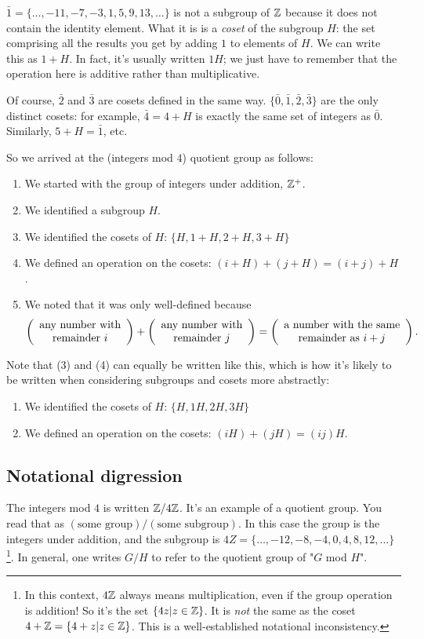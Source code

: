 $\bar 1 = \{\ldots, -11, -7, -3, 1, 5, 9, 13, \ldots\}$ is not a subgroup of
$\mathbb{Z}$ because it does not contain the identity element. What it is is a
\emph{coset} of the subgroup $H$: the set comprising all the results you get by
adding $1$ to elements of $H$. We can write this as $1 + H$. In fact, it's
usually written $1H$; we just have to remember that the operation here is
additive rather than multiplicative.

Of course, $\bar 2$ and $\bar 3$ are cosets defined in the same way. $\{\bar 0,
\bar 1, \bar 2, \bar 3\}$ are the only distinct cosets: for example, $\bar 4 =
4+H$ is exactly the same set of integers as $\bar 0$. Similarly, $5 + H = \bar
1$, etc.

So we arrived at the (integers mod $4$) quotient group as follows:

\begin{enumerate}
\item We started with the group of integers under addition, $\mathbb{Z}^+$.
\item We identified a subgroup $H$.
\item We identified the cosets of $H$: $\{H, 1+H, 2+H, 3+H\}$
\item We defined an operation on the cosets: $(i+H) + (j+H) = (i+j)+H$.
\item We noted that it was only well-defined because
  \begin{align*}
    \left(\begin{array}{c} \text{any number with} \\ \text{remainder $i$} \end{array}\right) +
    \left(\begin{array}{c} \text{any number with} \\ \text{remainder $j$} \end{array}\right) =
    \left(\begin{array}{c} \text{a number with the same} \\ \text{remainder as $i+j$} \end{array}\right).
  \end{align*}
\end{enumerate}

Note that (3) and (4) can equally be written like this, which is how it's
likely to be written when considering subgroups and cosets more abstractly:

\begin{enumerate}
\item We identified the cosets of $H$: $\{H, 1H, 2H, 3H\}$
\item We defined an operation on the cosets: $(iH) + (jH) = (ij)H$.
\end{enumerate}

\subsection{Notational digression}

The integers mod $4$ is written $\mathbb{Z}/4\mathbb{Z}$. It's an example of a quotient
group. You read that as $(\text{some group}) / (\text{some subgroup})$. In this
case the group is the integers under addition, and the subgroup is
$4Z = \{\ldots, -12, -8, -4, 0, 4, 8, 12, \ldots\}$\footnote{In this context,
  $4\mathbb{Z}$ always means multiplication, even if the group operation is addition!
  So it's the set $\{4z|z \in \mathbb{Z}\}$. It is \emph{not} the same as the coset
  $4 + \mathbb{Z} = \{4+z|z \in \mathbb{Z}\}$. This is a well-established notational
  inconsistency.}. In general, one writes $G/H$ to refer to the quotient group
of "$G$ mod $H$".


